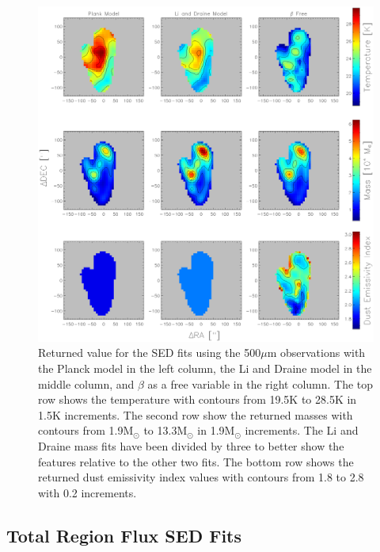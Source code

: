 \begin{figure}
  \centering
  \includegraphics[width=1.\textwidth]{sed_imgs/parameter_full.eps}
  \caption[SED Parameter Maps]{Returned value for the SED fits using the 500$\mu$m observations with the Planck model in the left column, the Li and Draine model in the middle column, and $\beta$ as a free variable in the right column.  The top row shows the temperature with contours from 19.5K to 28.5K in 1.5K increments.  The second row show the returned masses with contours from 1.9M$_\odot$ to 13.3M$_\odot$ in 1.9M$_\odot$ increments.  The Li and Draine mass fits have been divided by three to better show the features relative to the other two fits.  The bottom row shows the returned dust emissivity index values with contours from 1.8 to 2.8 with 0.2 increments.}
  \label{fig:param_fits}
\end{figure}

\subsection{Total Region Flux SED Fits}

